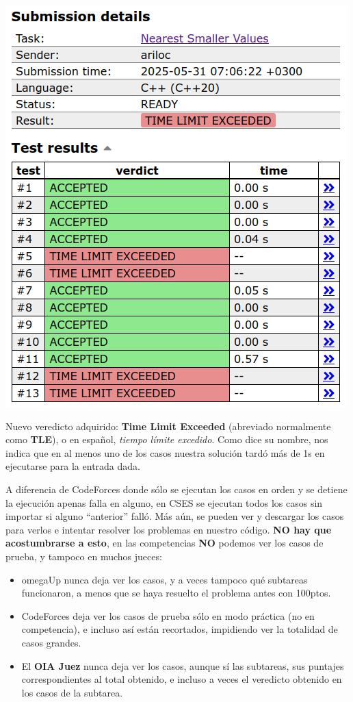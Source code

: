 \documentclass{beamer}
\begin{document}
    \begin{frame}[noframenumbering]
        \begin{center}
            \includegraphics[width=.4\linewidth]{./res/cses_tle.png}
        \end{center}
        \pause

        Nuevo veredicto adquirido: \textbf{Time Limit Exceeded} (abreviado normalmente como \textbf{TLE}), o en español, \textit{tiempo límite excedido}. Como dice su nombre, nos indica que en al menos uno de los casos nuestra solución tardó más de 1s en ejecutarse para la entrada dada.
    \end{frame}

    \begin{frame}[noframenumbering]
        A diferencia de CodeForces donde sólo se ejecutan los casos en orden y se detiene la ejecución apenas falla en alguno, en CSES se ejecutan todos los casos sin importar si alguno ``anterior'' falló. \pause Más aún, se pueden ver y descargar los casos para verlos e intentar resolver los problemas en nuestro código. \pause \textbf{NO hay que acostumbrarse a esto}, en las competencias \textbf{NO} podemos ver los casos de prueba, y tampoco en muchos jueces: \pause

        \begin{itemize}
            \item omegaUp nunca deja ver los casos, y a veces tampoco qué subtareas funcionaron, a menos que se haya resuelto el problema antes con 100ptos. \pause
            \item CodeForces deja ver los casos de prueba sólo en modo práctica (no en competencia), e incluso así están recortados, impidiendo ver la totalidad de casos grandes.\pause
            \item El \textbf{OIA Juez} nunca deja ver los casos, aunque sí las subtareas, sus puntajes correspondientes al total obtenido, e incluso a veces el veredicto obtenido en los casos de la subtarea.
        \end{itemize}
    \end{frame}
\end{document}
